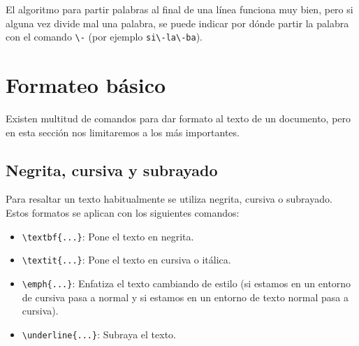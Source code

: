 \documentclass[
  letterpaper,
  DIV=11,
  numbers=noendperiod]{scrreport}
\providecommand{\tightlist}{%
  \setlength{\itemsep}{0pt}\setlength{\parskip}{0pt}}\usepackage{longtable,booktabs,array}
\begin{document}
\begin{tcolorbox}[enhanced jigsaw, colback=white, colframe=quarto-callout-warning-color-frame, title=\textcolor{quarto-callout-warning-color}{\faExclamationTriangle}\hspace{0.5em}{Advertencia}, bottomtitle=1mm, colbacktitle=quarto-callout-warning-color!10!white, bottomrule=.15mm, titlerule=0mm, opacityback=0, toptitle=1mm, arc=.35mm, left=2mm, rightrule=.15mm, toprule=.15mm, coltitle=black, leftrule=.75mm, opacitybacktitle=0.6, breakable]
El algoritmo para partir palabras al final de una línea funciona muy
bien, pero si alguna vez divide mal una palabra, se puede indicar por
dónde partir la palabra con el comando \texttt{\textbackslash{}-} (por
ejemplo \texttt{si\textbackslash{}-la\textbackslash{}-ba}).
\end{tcolorbox}


\hypertarget{formateo-buxe1sico}{%
\chapter{Formateo básico}\label{formateo-buxe1sico}}

Existen multitud de comandos para dar formato al texto de un documento,
pero en esta sección nos limitaremos a los más importantes.

\hypertarget{negrita-cursiva-y-subrayado}{%
\section{Negrita, cursiva y
subrayado}\label{negrita-cursiva-y-subrayado}}

Para resaltar un texto habitualmente se utiliza negrita, cursiva o
subrayado. Estos formatos se aplican con los siguientes comandos:

\begin{itemize}
\tightlist
\item
  \texttt{\textbackslash{}textbf\{...\}}: Pone el texto en negrita.
\item
  \texttt{\textbackslash{}textit\{...\}}: Pone el texto en cursiva o
  itálica.
\item
  \texttt{\textbackslash{}emph\{...\}}: Enfatiza el texto cambiando de
  estilo (si estamos en un entorno de cursiva pasa a normal y si estamos
  en un entorno de texto normal pasa a cursiva).
\item
  \texttt{\textbackslash{}underline\{...\}}: Subraya el texto.
\end{itemize}
\end{document}
